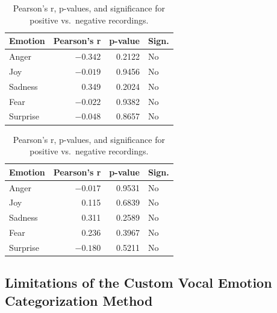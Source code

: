   \begin{table}[H]
    \centering
    \begin{subtable}{0.45\textwidth}
      \centering
      \caption*{\textbf{Positive Recordings}}
      \begin{tabular}{lrrl}
        \toprule
        \textbf{Emotion} & \textbf{Pearson’s r} & \textbf{p-value} & \textbf{Sign.} \\
        \midrule
        Anger    & $-0.342$ & 0.2122 & No \\
        Joy      & $-0.019$ & 0.9456 & No \\
        Sadness  & \phantom{$-$}0.349 & 0.2024 & No \\
        Fear     & $-0.022$ & 0.9382 & No \\
        Surprise & $-0.048$ & 0.8657 & No \\
        \bottomrule
      \end{tabular}
      \label{tab:rq1_corr_pos}
    \end{subtable}\hfill
    \begin{subtable}{0.45\textwidth}
      \centering
      \caption*{\textbf{Negative Recordings}}
      \begin{tabular}{lrrl}
        \toprule
        \textbf{Emotion} & \textbf{Pearson’s r} & \textbf{p-value} & \textbf{Sign.} \\
        \midrule
        Anger    & $-0.017$ & 0.9531 & No \\
        Joy      &  \phantom{$-$}0.115 & 0.6839 & No \\
        Sadness  &  \phantom{$-$}0.311 & 0.2589 & No \\
        Fear     &  \phantom{$-$}0.236 & 0.3967 & No \\
        Surprise & $-0.180$ & 0.5211 & No \\
        \bottomrule
      \end{tabular}
      \label{tab:rq1_corr_neg}
    \end{subtable}
    \caption{Pearson’s r, p-values, and significance for positive vs.\ negative recordings.}
    \label{tab:rq1_corr_pos_neg_side_by_side}
  \end{table}
  
  

\subsection{Limitations of the Custom Vocal Emotion Categorization Method}

